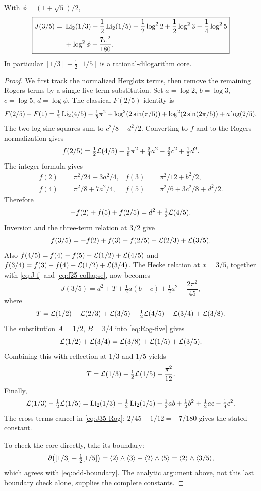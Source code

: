 \begin{theorem}\label{thm:J35}
With $\phi=(1+\sqrt5)/2$,
\begin{equation}\label{eq:J35}
 \boxed{\begin{aligned}
 J(3/5)={}&\operatorname{Li}_2(1/3)-\frac12\operatorname{Li}_2(1/5)
  +\frac12\log^22+\frac12\log^23-\frac14\log^25\\
 &+\log^2\phi-\frac{7\pi^2}{180}.
 \end{aligned}}
\end{equation}
In particular $[1/3]-\tfrac12[1/5]$ is a rational-dilogarithm core.
\end{theorem}
\begin{proof}
We first track the normalized Herglotz terms, then remove the remaining
Rogers terms by a single five-term substitution. Set
$a=\log2$, $b=\log3$, $c=\log5$, $d=\log\phi$.
The classical $F(2/5)$ identity \cite[(24)]{RZ} is
\[
 F(2/5)-F(1)=\tfrac12\operatorname{Li}_2(4/5)-\tfrac15\pi^2
 +\log^2(2\sin(\pi/5))+\log^2(2\sin(2\pi/5))
 +a\log(2/5).
\]
The two log-sine squares sum to $c^2/8+d^2/2$. Converting to $f$ and
to the Rogers normalization gives
\begin{equation}\label{eq:f25}
 f(2/5)=\tfrac12\mathcal L(4/5)-\tfrac18\pi^2
                      +\tfrac34a^2-\tfrac38c^2+\tfrac12d^2.
\end{equation}
The integer formula gives
\begin{align*}
 f(2)&=\pi^2/24+3a^2/4,&
 f(3)&=\pi^2/12+b^2/2,\\
 f(4)&=\pi^2/8+7a^2/4,&
 f(5)&=\pi^2/6+3c^2/8+d^2/2.
\end{align*}
Therefore
\begin{equation}\label{eq:f25-collapse}
 -f(2)+f(5)+f(2/5)=d^2+\tfrac12\mathcal L(4/5).
\end{equation}
Inversion and the three-term relation at $3/2$ give
\[
 f(3/5)=-f(2)+f(3)+f(2/5)-\mathcal L(2/3)+\mathcal L(3/5).
\]
Also
$f(4/5)=f(4)-f(5)-\mathcal L(1/2)+\mathcal L(4/5)$ and
$f(3/4)=f(3)-f(4)-\mathcal L(1/2)+\mathcal L(3/4)$.
The Hecke relation at $x=3/5$, together with
\eqref{eq:J-f} and \eqref{eq:f25-collapse}, now becomes
\begin{equation}\label{eq:J35-Rog}
 J(3/5)=d^2+T+\tfrac12a(b-c)+\tfrac12a^2+\frac{2\pi^2}{45},
\end{equation}
where
\[
 T=\mathcal L(1/2)-\mathcal L(2/3)+\mathcal L(3/5)-\tfrac12\mathcal L(4/5)
                         -\mathcal L(3/4)+\mathcal L(3/8).
\]
The substitution $A=1/2$, $B=3/4$ into \eqref{eq:Rog-five} gives
\[
 \mathcal L(1/2)+\mathcal L(3/4)=\mathcal L(3/8)+\mathcal L(1/5)+\mathcal L(3/5).
\]
Combining this with reflection at $1/3$ and $1/5$ yields
\[
 T=\mathcal L(1/3)-\tfrac12\mathcal L(1/5)-\frac{\pi^2}{12}.
\]
Finally,
\[
 \mathcal L(1/3)-\tfrac12\mathcal L(1/5)
 =\operatorname{Li}_2(1/3)-\tfrac12\operatorname{Li}_2(1/5)
  -\tfrac12ab+\tfrac12b^2+\tfrac12ac-\tfrac14c^2.
\]
The cross terms cancel in \eqref{eq:J35-Rog};
$2/45-1/12=-7/180$ gives the stated constant.

To check the core directly, take its boundary:
\[
 \partial\bigl([1/3]-\tfrac12[1/5]\bigr)
 =\langle 2\rangle\wedge\langle 3\rangle-\langle 2\rangle\wedge\langle 5\rangle
 =\langle 2\rangle\wedge\langle 3/5\rangle,
\]
which agrees with \eqref{eq:odd-boundary}. The analytic argument above,
not this last boundary check alone, supplies the complete constants.
\end{proof}

